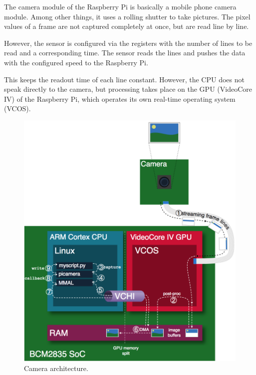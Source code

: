 \documentclass[12pt, a4paper]{report}
\begin{document}
    The camera module of the Raspberry Pi is basically a mobile phone camera module. Among other things, it uses a rolling shutter to take pictures. The pixel values of a frame are not captured completely at once, but are read line by line.
    
    However, the sensor is configured via the registers with the number of lines to be read and a corresponding time. The sensor reads the lines and pushes the data with the configured speed to the Raspberry Pi.
    
    This keeps the readout time of each line constant. However, the CPU does not speak directly to the camera, but processing takes place on the GPU (VideoCore IV) of the Raspberry Pi, which operates its own real-time operating system (VCOS).
    
    \bigskip
    \noindent
    \begin{figure}[H]
    \centering
    \includegraphics[scale=0.7]{Images/camera_architecture.png}
    
    \caption{Camera architecture. \cite{ReadTheDocsPicamera}}
    \end{figure}
    
    
    
\end{document}
